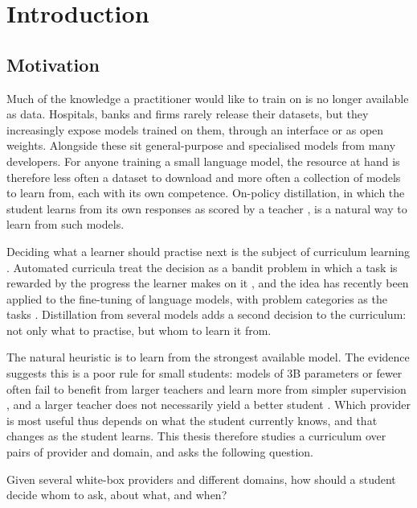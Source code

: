 \chapter{Introduction}
\label{chap:Introduction}

\section{Motivation}
\label{sec:Motivation}

Much of the knowledge a practitioner would like to train on is no longer available
as data. Hospitals, banks and firms rarely release their datasets, but they
increasingly expose models trained on them, through an interface or as open weights.
Alongside these sit general-purpose and specialised models from many developers. For
anyone training a small language model, the resource at hand is therefore less often
a dataset to download and more often a collection of models to learn from, each with
its own competence. On-policy distillation, in which the student learns from its own
responses as scored by a teacher \autocite{agarwal_gkd_2024,gu_minillm_2024}, is a
natural way to learn from such models.

Deciding what a learner should practise next is the subject of curriculum learning
\autocite{bengio_curriculum_2009}. Automated curricula treat the decision as a bandit
problem in which a task is rewarded by the progress the learner makes on it
\autocite{graves_curriculum_2017,matiisen_tscl_2017}, and the idea has recently been
applied to the fine-tuning of language models, with problem categories as the tasks
\autocite{chen_sec_2025}. Distillation from several models adds a second decision to
the curriculum: not only what to practise, but whom to learn it from.

The natural heuristic is to learn from the strongest available model. The evidence
suggests this is a poor rule for small students: models of 3B parameters or fewer
often fail to benefit from larger teachers and learn more from simpler supervision
\autocite{li_learnability_gap_2025}, and a larger teacher does not necessarily yield
a better student \autocite{guo_lada_2026}. Which provider is most useful thus depends
on what the student currently knows, and that changes as the student learns. This
thesis therefore studies a curriculum over pairs of provider and domain, and asks the
following question.

\begin{mdframed}[backgroundcolor=bg, linewidth=0pt, innertopmargin=8pt,
  innerbottommargin=8pt]
Given several white-box providers and different domains, how should a student decide
whom to ask, about what, and when?
\end{mdframed}

